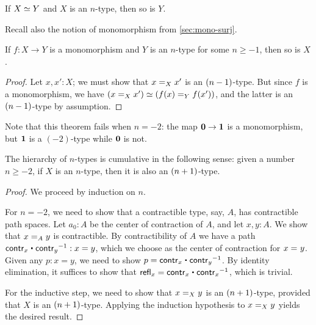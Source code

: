 \begin{cor}\label{cor:preservation-hlevels-weq}
 If $\eqv{X}{Y}$ and $X$ is an $n$-type, then so is $Y$.
\end{cor}

Recall also the notion of monomorphism from \autoref{sec:mono-surj}.

\begin{thm}\label{thm:isntype-mono}
  If $f:X\to Y$ is a monomorphism and $Y$ is an $n$-type for some $n\ge -1$, then so is $X$.
\end{thm}
\begin{proof}
  Let $x,x':X$; we must show that $\id[X]{x}{x'}$ is an $\nminusone$-type.
  But since $f$ is a monomorphism, we have $(\id[X]{x}{x'}) \simeq (\id[Y]{f(x)}{f(x')})$, and the latter is an $\nminusone$-type by assumption.
\end{proof}

Note that this theorem fails when $n=-2$: the map $\emptyt \to \unit$ is a monomorphism, but $\unit$ is a $(-2)$-type while $\emptyt$ is not.

\begin{thm}\label{thm:hlevel-cumulative}
 The hierarchy of $n$-types is cumulative in the following sense:
   given a number $n \geq -2$, if $X$ is an $n$-type, then it is also an $\nplusone$-type.
\end{thm}

\begin{proof}
 We proceed by induction on $n$.

 For $n = -2$, we need to show that a contractible type, say, $A$, has contractible path spaces.
       Let $a_0: A$ be the center of contraction of $A$, and let $x, y : A$. We show that $\id[A]{x}{y}$
       is contractible.
       By contractibility of $A$ we have a path $\contr_x \ct \opp{\contr_y} : x = y$, which we choose as
       the center of contraction for $\id{x}{y}$.
       Given any $p : x = y$, we need to show $p = \contr_x \ct \opp{\contr_y}$.
           By identity elimination, it suffices to show that
        $\refl{x} = \contr_x \ct \opp{\contr_x}$, which is trivial.

 For the inductive step, we need to show that $\id[X]{x}{y}$ is an $\nplusone$-type, provided
          that $X$ is an $\nplusone$-type. Applying the induction hypothesis to $\id[X]{x}{y}$
         yields the desired result.
\end{proof}


